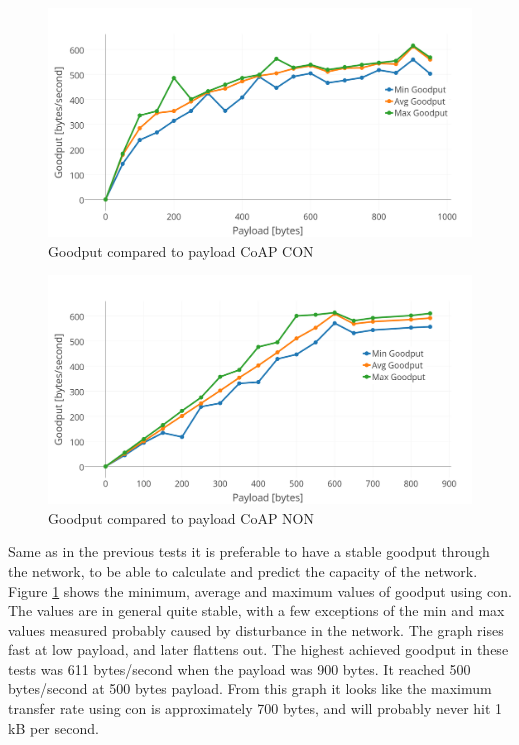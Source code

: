 \begin{figure}[ht]
    \centering
    \includegraphics[width=1.0\textwidth]{goodput_payload_CON.png}    
    \caption{Goodput compared to payload CoAP CON}
    \label{fig:goodPayload_CON}
\end{figure}

\begin{figure}[h!]
    \centering
    \includegraphics[width=1.0\textwidth]{goodput_payload_NON.png}    
    \caption{Goodput compared to payload CoAP NON}
    \label{fig:goodPayload_NON}
\end{figure}


\noindent Same as in the previous tests it is preferable to have a stable \gls{goodput} through the network, to be able to calculate and predict the capacity of the network. Figure \ref{fig:goodPayload_CON} shows the minimum, average and maximum values of \gls{goodput} using \gls{con}. The values are in general quite stable, with a few exceptions of the min and max values measured probably caused by disturbance in the network. The graph rises fast at low payload, and later flattens out. The highest achieved \gls{goodput} in these tests was 611 bytes/second when the \gls{payload} was 900 bytes. It reached 500 bytes/second at 500 bytes \gls{payload}. From this graph it looks like the maximum transfer rate using \gls{con} is approximately 700 bytes, and will probably never hit 1 kB per second. 

